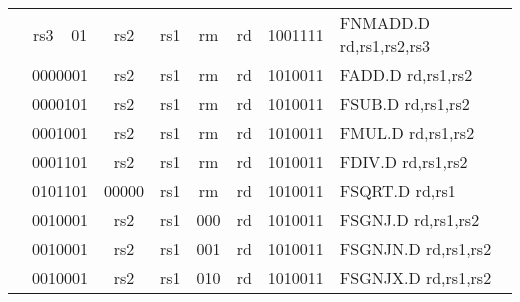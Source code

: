 \begin{table}[p]
\begin{small}
\begin{center}
\begin{tabular}{p{0in}p{0.4in}p{0.05in}p{0.05in}p{0.05in}p{0.05in}p{0.4in}p{0.6in}p{0.4in}p{0.6in}p{0.7in}l}
&
\multicolumn{2}{|c|}{rs3} &
\multicolumn{2}{c|}{01} &
\multicolumn{2}{c|}{rs2} &
\multicolumn{1}{c|}{rs1} &
\multicolumn{1}{c|}{rm} &
\multicolumn{1}{c|}{rd} &
\multicolumn{1}{c|}{1001111} & FNMADD.D rd,rs1,rs2,rs3 \\
\cline{2-11}
  

&
\multicolumn{4}{|c|}{0000001} &
\multicolumn{2}{c|}{rs2} &
\multicolumn{1}{c|}{rs1} &
\multicolumn{1}{c|}{rm} &
\multicolumn{1}{c|}{rd} &
\multicolumn{1}{c|}{1010011} & FADD.D rd,rs1,rs2 \\
\cline{2-11}
  

&
\multicolumn{4}{|c|}{0000101} &
\multicolumn{2}{c|}{rs2} &
\multicolumn{1}{c|}{rs1} &
\multicolumn{1}{c|}{rm} &
\multicolumn{1}{c|}{rd} &
\multicolumn{1}{c|}{1010011} & FSUB.D rd,rs1,rs2 \\
\cline{2-11}
  

&
\multicolumn{4}{|c|}{0001001} &
\multicolumn{2}{c|}{rs2} &
\multicolumn{1}{c|}{rs1} &
\multicolumn{1}{c|}{rm} &
\multicolumn{1}{c|}{rd} &
\multicolumn{1}{c|}{1010011} & FMUL.D rd,rs1,rs2 \\
\cline{2-11}
  

&
\multicolumn{4}{|c|}{0001101} &
\multicolumn{2}{c|}{rs2} &
\multicolumn{1}{c|}{rs1} &
\multicolumn{1}{c|}{rm} &
\multicolumn{1}{c|}{rd} &
\multicolumn{1}{c|}{1010011} & FDIV.D rd,rs1,rs2 \\
\cline{2-11}
  

&
\multicolumn{4}{|c|}{0101101} &
\multicolumn{2}{c|}{00000} &
\multicolumn{1}{c|}{rs1} &
\multicolumn{1}{c|}{rm} &
\multicolumn{1}{c|}{rd} &
\multicolumn{1}{c|}{1010011} & FSQRT.D rd,rs1 \\
\cline{2-11}
  

&
\multicolumn{4}{|c|}{0010001} &
\multicolumn{2}{c|}{rs2} &
\multicolumn{1}{c|}{rs1} &
\multicolumn{1}{c|}{000} &
\multicolumn{1}{c|}{rd} &
\multicolumn{1}{c|}{1010011} & FSGNJ.D rd,rs1,rs2 \\
\cline{2-11}
  

&
\multicolumn{4}{|c|}{0010001} &
\multicolumn{2}{c|}{rs2} &
\multicolumn{1}{c|}{rs1} &
\multicolumn{1}{c|}{001} &
\multicolumn{1}{c|}{rd} &
\multicolumn{1}{c|}{1010011} & FSGNJN.D rd,rs1,rs2 \\
\cline{2-11}
  

&
\multicolumn{4}{|c|}{0010001} &
\multicolumn{2}{c|}{rs2} &
\multicolumn{1}{c|}{rs1} &
\multicolumn{1}{c|}{010} &
\multicolumn{1}{c|}{rd} &
\multicolumn{1}{c|}{1010011} & FSGNJX.D rd,rs1,rs2 \\
\cline{2-11}
  


\end{tabular}
\end{center}
\end{small}
\end{table}
